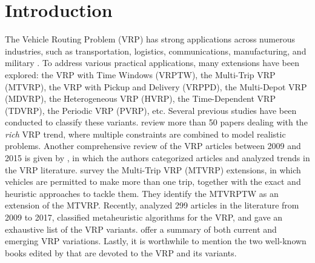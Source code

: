 \section{Introduction}

The Vehicle Routing Problem (VRP) has strong applications across numerous industries, such as transportation, logistics, communications, manufacturing, and military  \citep{vidal2013heuristics}.  To address various practical applications, many extensions have been explored: the VRP with Time Windows (VRPTW), the Multi-Trip VRP (MTVRP), the VRP with Pickup and Delivery (VRPPD), the Multi-Depot VRP (MDVRP), the Heterogeneous VRP (HVRP), the Time-Dependent VRP (TDVRP), the Periodic VRP (PVRP), etc.  Several previous studies have been conducted to classify these variants.  \cite{caceres2014rich} review more than 50 papers dealing with the \textit{rich} VRP trend, where multiple constraints are combined to model realistic problems. Another comprehensive review of the VRP articles between 2009 and 2015 is given by \cite{braekers2016vehicle}, in which the authors categorized articles and analyzed trends in the VRP literature.  \cite{cattaruzza2016vehicle} survey the Multi-Trip VRP (MTVRP) extensions, in which vehicles are permitted to make more than one trip, together with the exact and heuristic approaches to tackle them.  They identify the MTVRPTW as an extension of the MTVRP.  Recently, \cite{elshaer2020taxonomic} analyzed 299 articles in the literature from 2009 to 2017, classified metaheuristic algorithms for the VRP, and gave an exhaustive list of the VRP variants.  \cite{vidal2020concise} offer a summary of both current and emerging VRP variations.    Lastly, it is worthwhile to mention the two well-known books edited by \cite{toth2002vehicle, toth2014vehicle} that are devoted to the VRP and its variants.
\newline

